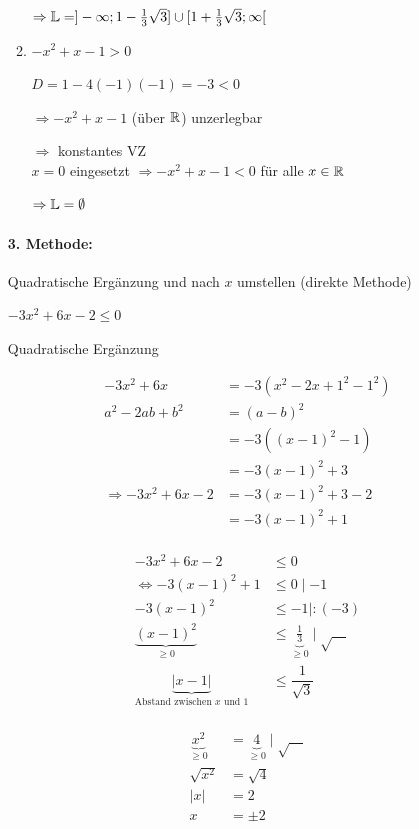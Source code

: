 \begin{enumerate}[A)]
\begin{enumerate}[1.]
		$\Rightarrow \mathbb{L}=]-\infty;1 - \frac{1}{3}\sqrt{3}] \cup [1 + \frac{1}{3}\sqrt{3};\infty[$
		
		
		\item $-x^2+x-1>0$
		
		$D=1-4(-1)(-1) = -3 < 0$
		
		$\Rightarrow -x^2+x-1$ (über $\mathbb{R}$) unzerlegbar
		
		$\Rightarrow$ konstantes VZ\\
		$x=0$ eingesetzt $\Rightarrow -x^2+x-1<0$ für alle $x\in\mathbb{R}$
		
		$\Rightarrow \mathbb{L}=\emptyset$
	\end{enumerate}
	
	\clearpage
	\paragraph{3. Methode:} Quadratische Ergänzung und nach $x$ umstellen (direkte Methode)
	
	\Bsp $-3x^2+6x-2\le0$
	
	Quadratische Ergänzung
	
	\begin{align*}
	-3x^2+6x &= -3(x^2-2x+1^2-1^2)\\
	a^2-2ab+b^2 &= (a-b)^2\\
	&= -3((x-1)^2-1)\\
	&= -3(x-1)^2+3\\
	\Rightarrow -3x^2+6x-2 &= -3(x-1)^2+3-2\\
	&= -3(x-1)^2+1\\
	\end{align*}
	
	\begin{minipage}{0.5\linewidth}
		\begin{align*}
		-3x^2+6x-2 &\le 0\\
		\Leftrightarrow -3(x-1)^2+1 &\le 0 \mid -1\\
		-3(x-1)^2 &\le -1 \mid \colon (-3)\\
		\underbrace{(x-1)^2}_{\ge0} &\le \underbrace{\frac{1}{3}}_{\ge0} \mid \sqrt{\quad}\\
		\underbrace{|x-1|}_\text{Abstand zwischen $x$ und $1$} &\le \dfrac{1}{\sqrt{3}}\\
		\end{align*}
	\end{minipage}
	\begin{minipage}{0.5\linewidth}
		\begin{align*}
		\underbrace{x^2}_{\ge0} &= \underbrace{4}_{\ge0} \mid \sqrt{\quad}\\
		\sqrt{x^2} &= \sqrt{4}\\
		|x| &= 2\\
		x &= \pm 2\\
		\end{align*}
		

\end{minipage}
\end{enumerate}
